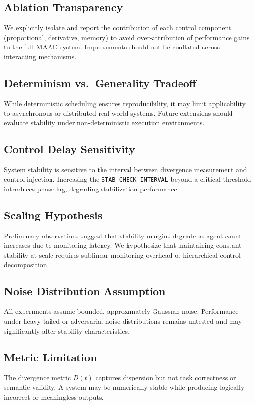 \documentclass{article}
\begin{document}
\subsection*{Ablation Transparency}
We explicitly isolate and report the contribution of each control component (proportional, derivative, memory) to avoid over-attribution of performance gains to the full MAAC system. Improvements should not be conflated across interacting mechanisms.

\subsection*{Determinism vs.\ Generality Tradeoff}
While deterministic scheduling ensures reproducibility, it may limit applicability to asynchronous or distributed real-world systems. Future extensions should evaluate stability under non-deterministic execution environments.

\subsection*{Control Delay Sensitivity}
System stability is sensitive to the interval between divergence measurement and control injection. Increasing the \texttt{STAB\_CHECK\_INTERVAL} beyond a critical threshold introduces phase lag, degrading stabilization performance.

\subsection*{Scaling Hypothesis}
Preliminary observations suggest that stability margins degrade as agent count increases due to monitoring latency. We hypothesize that maintaining constant stability at scale requires sublinear monitoring overhead or hierarchical control decomposition.

\subsection*{Noise Distribution Assumption}
All experiments assume bounded, approximately Gaussian noise. Performance under heavy-tailed or adversarial noise distributions remains untested and may significantly alter stability characteristics.

\subsection*{Metric Limitation}
The divergence metric $D(t)$ captures dispersion but not task correctness or semantic validity. A system may be numerically stable while producing logically incorrect or meaningless outputs.
\end{document}
